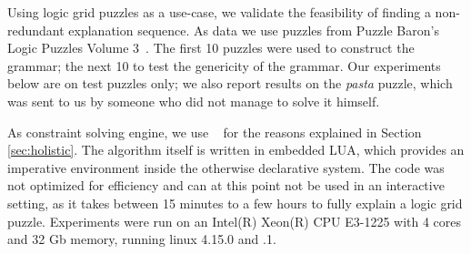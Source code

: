 Using logic grid puzzles as a use-case, we validate the feasibility of finding a non-redundant explanation sequence.
% 
As data we use puzzles from Puzzle Baron’s Logic Puzzles Volume 3~\cite{logigrammen}. The first 10 puzzles were used to construct the grammar; the next 10 to test the genericity of the grammar. 
Our experiments below are on test puzzles only; we also report results on the \textit{pasta} puzzle, which was sent to us by someone who did not manage to solve it himself.

As constraint solving engine, we use \idp~\cite{IDP} for the reasons explained in Section \ref{sec:holistic}. %
% 
The algorithm itself is written in embedded LUA, which provides an imperative environment inside the otherwise declarative \idp system. The code was not optimized for efficiency and can at this point not be used in an interactive setting, as it takes between 15 minutes to a few hours to fully explain a logic grid puzzle. Experiments were run on an Intel(R) Xeon(R) CPU E3-1225 with 4 cores and 32 Gb memory, running linux 4.15.0 and .1.

% 

